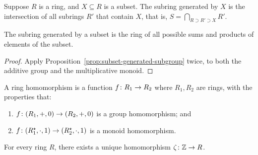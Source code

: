 \begin{definition}
    Suppose \(R\) is a ring, and \(X \subseteq R\) is a subset.
    The subring generated by \(X\)
    is the intersection of all subrings \(R'\) that contain \(X\),
    that is, \(S = \bigcap_{R \supset R' \supset X} R'\).
\end{definition}
\begin{proposition}
    The subring generated by a subset
    is the ring of all possible sums and products of elements of the subset.
\end{proposition}
\begin{proof}
    Apply Proposition~\ref{prop:subset-generated-subgroup} twice,
    to both the additive group and the multiplicative monoid.
\end{proof}

\begin{definition}
    A ring homomorphism is a function \(f\colon R_1\to R_2\)
    where \(R_1,R_2\) are rings,
    with the properties that:
    \begin{enumerate}[label={(\roman*)}, itemsep=0mm]
        \item \(f\colon(R_1,+,0)\to(R_2,+,0)\) is a group homomorphism; and
        \item \(f\colon(R_1^\star,\cdot,1)\to(R_2^\star,\cdot,1)\)
            is a monoid homomorphism.
    \end{enumerate}
\end{definition}
\begin{proposition}
    For every ring \(R\),
    there exists a unique homomorphism \(\zeta\colon\mathbb{Z}\to R\).
\end{proposition}
